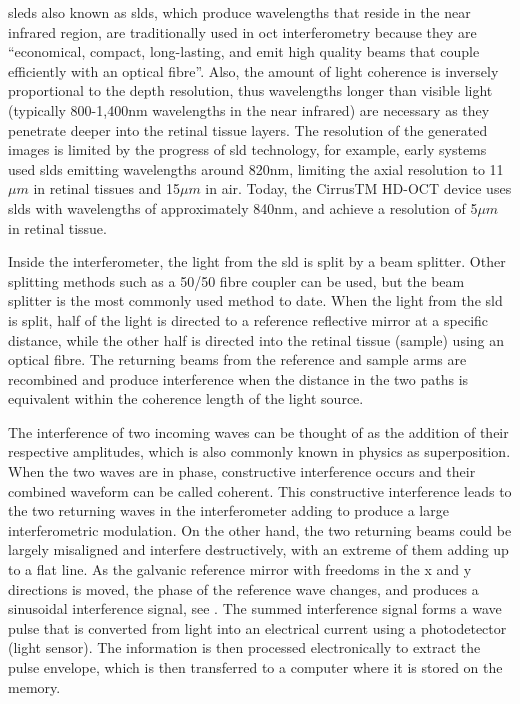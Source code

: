 \Gls{sled}s also known as \Gls{sld}s, which produce wavelengths that reside in the near infrared region,
are traditionally used in \Gls{oct} interferometry because they are \enquote{economical,
compact, long-lasting, and emit high quality beams that couple efficiently
with an optical fibre}.\cite{mbib_6} Also, the amount of light coherence
is inversely proportional to the depth resolution, thus wavelengths longer
than visible light (typically 800-1,400nm wavelengths in the near infrared) 
are necessary as they penetrate deeper into the retinal tissue layers.\cite{mbib_4,mbib_7}
The resolution of the generated images is limited by the progress of \Gls{sld}
technology, for example, early systems used \Gls{sld}s emitting wavelengths around
820nm, limiting the axial resolution to 11$\mu m$ in retinal tissues and 15$\mu m$
in air. \cite{mbib_6}  Today, the CirrusTM HD-OCT device uses \Gls{sld}s with wavelengths
of approximately 840nm, and achieve a resolution of 5$\mu m$ in retinal tissue.\cite{mbib_7}

Inside the interferometer, the light from the \Gls{sld} is split by a beam splitter.
Other splitting methods such as a 50/50 fibre coupler can be used, but the beam
splitter is the most commonly used method to date.  When the light from the \Gls{sld}
is split, half of the light is directed to a reference reflective mirror at a
specific distance, while the other half is directed into the retinal tissue (sample)
using an optical fibre.  The returning beams from the reference and sample arms
are recombined and produce interference when the distance in the two paths is
equivalent within the coherence length of the light source. \cite{mbib_5,mbib_6}

The interference of two incoming waves can be thought of as the addition of their
respective amplitudes, which is also commonly known in physics as superposition.
When the two waves are in phase, constructive interference occurs and their combined
waveform can be called coherent.  This constructive interference leads to the two
returning waves in the interferometer adding to produce a large interferometric
modulation.  On the other hand, the two returning beams could be largely misaligned
and interfere destructively, with an extreme of them adding up to a flat line.
As the galvanic reference mirror with freedoms in the x and y directions is moved,
the phase of the reference wave changes, and produces a sinusoidal interference
signal, see . The summed interference signal forms a wave pulse 
that is converted
from light into an electrical current using a photodetector (light sensor).\cite{mbib_6}
The information is then processed electronically to extract the pulse envelope, which
is then transferred to a computer where it is stored on the memory.\cite{mbib_6}

